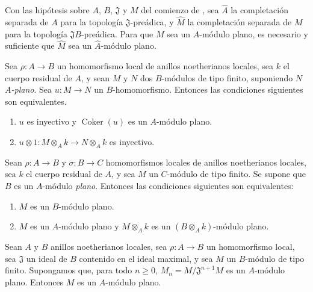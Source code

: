 \begin{env}[10.2.3]
\label{0.10.2.3}
\label{0.10.2.3-fr}
Con las hipótesis sobre $A$, $B$, $\mathfrak{J}$ y $M$ del comienzo de , sea $\widehat A$ la completación separada de $A$ para la topología $\mathfrak{J}$-preádica, y $\widehat M$ la completación separada de $M$ para la topología $\mathfrak{J}B$-preádica.
Para que $M$ sea un $A$-módulo plano, es necesario y suficiente que $\widehat M$ sea un $\widehat A$-módulo plano.
\end{env}

\begin{env}[10.2.4]
\label{0.10.2.4}
\label{0.10.2.4-fr}
Sea $\rho:A\to B$ un homomorfismo local de anillos noetherianos locales, sea $k$ el cuerpo residual de $A$, y sean $M$ y $N$ dos $B$-módulos de tipo finito, suponiendo $N$ \emph{$A$-plano}.
Sea $u:M\to N$ un $B$-homomorfismo.
Entonces las condiciones siguientes son equivalentes.
\begin{enumerate}
  \item[(a)] $u$ es inyectivo y $\operatorname{Coker}(u)$ es un $A$-módulo plano.
  \item[(b)] $u\otimes1:M\otimes_A k\to N\otimes_A k$ es inyectivo.
\end{enumerate}
\end{env}

\begin{env}[10.2.5]
\label{0.10.2.5}
\label{0.10.2.5-fr}
Sean $\rho:A\to B$ y $\sigma:B\to C$ homomorfismos locales de anillos noetherianos locales, sea $k$ el cuerpo residual de $A$, y sea $M$ un $C$-módulo de tipo finito.
Se supone que $B$ es un $A$-módulo \emph{plano}. Entonces las condiciones siguientes son equivalentes:
\begin{enumerate}
  \item[$a)$] $M$ es un $B$-módulo plano.
  \item[$b)$] $M$ es un $A$-módulo plano y $M\otimes_A k$ es un $(B\otimes_A k)$-módulo plano.
\end{enumerate}
\end{env}

\begin{proposition}[10.2.6]
\label{0.10.2.6}
\label{0.10.2.6-fr}
Sean $A$ y $B$ anillos noetherianos locales, sea $\rho:A\to B$ un homomorfismo local, sea $\mathfrak{J}$ un ideal de $B$ contenido en el ideal maximal, y sea $M$ un $B$-módulo de tipo finito.
Supongamos que, para todo $n\geq0$, $M_n=M/\mathfrak{J}^{n+1}M$ es un $A$-módulo plano.
Entonces $M$ es un $A$-módulo plano.
\end{proposition}


